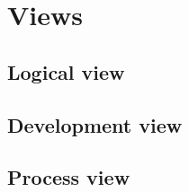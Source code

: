 
\section{Views}

\subsection{Logical view}



\subsection{Development view}

\subsection{Process view}




